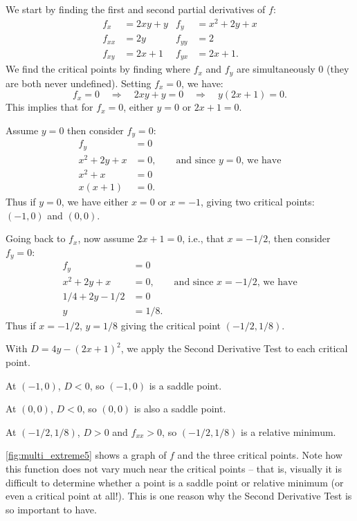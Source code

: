 {We start by finding the first and second partial derivatives of $f$:
\begin{align*}
f_x &= 2xy+y & f_y &= x^2+2y+x \\
f_{xx} &= 2y & f_{yy} &= 2\\
f_{xy} &= 2x+1 & f_{yx} &= 2x+1.
\end{align*}
We find the critical points by finding where $f_x$ and $f_y$ are simultaneously 0 (they are both never undefined). Setting $f_x=0$, we have:
$$f_x=0 \quad \Rightarrow \quad 2xy+y=0\quad \Rightarrow \quad y(2x+1)=0.$$
This implies that for $f_x=0$, either $y=0$ or $2x+1=0$.

Assume $y=0$ then consider $f_y=0$:
\begin{align*}
f_y &= 0\\
x^2+2y+x &= 0,  \qquad \text{and since $y=0$, we have}\\
x^2+x &= 0\\
x(x+1) & = 0.
\end{align*}
Thus if $y=0$, we have either $x=0$ or $x=-1$, giving two critical points: $(-1,0)$ and $(0,0)$. 

Going back to $f_x$, now assume $2x+1=0$, i.e., that $x=-1/2$, then consider $f_y=0$:
\begin{align*}
f_y &= 0\\
x^2+2y+x &= 0,  \qquad \text{and since $x=-1/2$, we have}\\
1/4+2y-1/2 &= 0\\
y&= 1/8.
\end{align*}
Thus if $x=-1/2$, $y=1/8$ giving the critical point $(-1/2,1/8)$. 

With $D = 4y-(2x+1)^2$, we apply the Second Derivative Test to each critical point.

At $(-1,0)$, $D <0$, so $(-1,0)$ is a saddle point.

At $(0,0)$, $D<0$, so $(0,0)$ is also a saddle point.

At $(-1/2,1/8)$, $D>0$ and $f_{xx} > 0$, so $(-1/2,1/8)$ is a relative minimum.

\autoref{fig:multi_extreme5} shows a graph of $f$ and the three critical points. Note how this function does not vary much near the critical points -- that is, visually it is difficult to determine whether a point is a saddle point or relative minimum (or even a critical point at all!). This is one reason why the Second Derivative Test is so important to have.}

